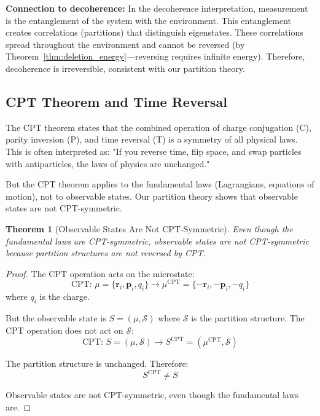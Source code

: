 \documentclass[twocolumn,10pt]{article}
\newtheorem{theorem}{Theorem}[section]
\theoremstyle{definition}
\theoremstyle{remark}
\begin{document}
\noindent\textbf{Connection to decoherence:} In the decoherence interpretation\cite{zurek1991}, measurement is the entanglement of the system with the environment. This entanglement creates correlations (partitions) that distinguish eigenstates. These correlations spread throughout the environment and cannot be reversed (by Theorem~\ref{thm:deletion_energy}—reversing requires infinite energy). Therefore, decoherence is irreversible, consistent with our partition theory.

\subsection{CPT Theorem and Time Reversal}

The CPT theorem\cite{luders1954,pauli1955} states that the combined operation of charge conjugation (C), parity inversion (P), and time reversal (T) is a symmetry of all physical laws. This is often interpreted as: "If you reverse time, flip space, and swap particles with antiparticles, the laws of physics are unchanged."

\vspace{0.2cm}
\noindent But the CPT theorem applies to the fundamental laws (Lagrangians, equations of motion), not to observable states. Our partition theory shows that observable states are not CPT-symmetric.

\begin{theorem}[Observable States Are Not CPT-Symmetric]
\label{thm:not_cpt_symmetric}
Even though the fundamental laws are CPT-symmetric, observable states are not CPT-symmetric because partition structures are not reversed by CPT.
\end{theorem}

\begin{proof}
The CPT operation acts on the microstate:
\begin{equation}
\text{CPT}: \, \mu = \{\mathbf{r}_i, \mathbf{p}_i, q_i\} \to \mu^{\text{CPT}} = \{-\mathbf{r}_i, -\mathbf{p}_i, -q_i\}
\end{equation}
where $q_i$ is the charge.

But the observable state is $S = (\mu, \mathcal{S})$ where $\mathcal{S}$ is the partition structure. The CPT operation does not act on $\mathcal{S}$:
\begin{equation}
\text{CPT}: \, S = (\mu, \mathcal{S}) \to S^{\text{CPT}} = (\mu^{\text{CPT}}, \mathcal{S})
\end{equation}

The partition structure is unchanged. Therefore:
\begin{equation}
S^{\text{CPT}} \neq S
\end{equation}

Observable states are not CPT-symmetric, even though the fundamental laws are.
\end{proof}
\end{document}
